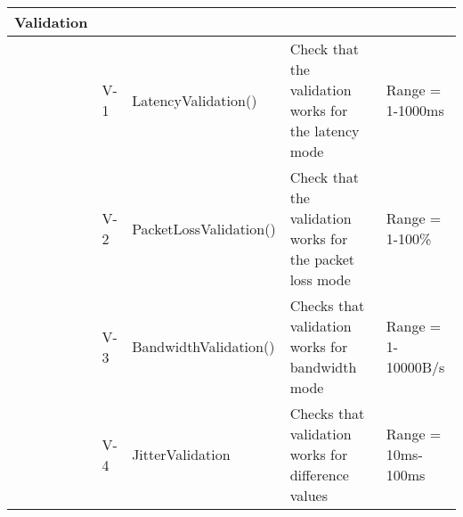 \begin{longtable}{| p{2cm} | p{0.5cm} | p{4cm} | p{5cm} | p{3cm} |}
	Validation &&&& \\ \hline
	&V-1& LatencyValidation() & Check that the validation works for the latency mode & Range = 1-1000ms \\\hline
	&V-2& PacketLossValidation() & Check that the validation works for the packet loss mode & Range = 1-100\%\\\hline
	&V-3& BandwidthValidation() & Checks that validation works for bandwidth mode & Range = 1-10000B/s\\\hline
	&V-4& JitterValidation & Checks that validation works for difference values & Range = 10ms-100ms \\\hline	
	
\end{longtable}